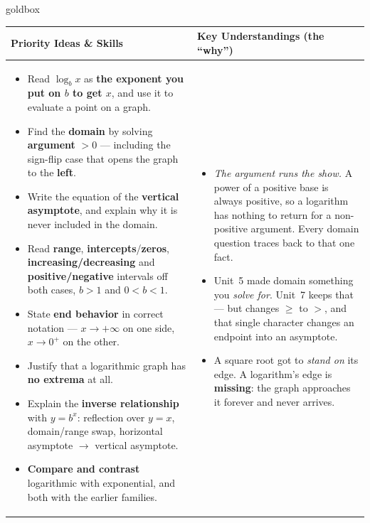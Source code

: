 \documentclass[10pt]{article}
\begin{document}
\renewcommand{\arraystretch}{1.4}
\begin{skillbox}{goldbox}
\begin{tabularx}{\linewidth}{@{}X|X@{}}
\textbf{Priority Ideas \& Skills} & \textbf{Key Understandings (the ``why'')} \\[2pt]
\hline
\vspace{-6pt}
\begin{itemize}[leftmargin=1.1em, nosep, after=\vspace{2pt}]
  \item Read $\log_b x$ as \textbf{the exponent you put on $b$ to get $x$}, and use it to evaluate a point on a graph.
  \item Find the \textbf{domain} by solving \textbf{argument} $>0$ --- including the sign-flip case that opens the graph to the \textbf{left}.
  \item Write the equation of the \textbf{vertical asymptote}, and explain why it is never included in the domain.
  \item Read \textbf{range}, \textbf{intercepts}/\textbf{zeros}, \textbf{increasing/decreasing} and \textbf{positive/negative} intervals off both cases, $b>1$ and $0<b<1$.
  \item State \textbf{end behavior} in correct notation --- $x\to+\infty$ on one side, $x\to 0^{+}$ on the other.
  \item Justify that a logarithmic graph has \textbf{no extrema} at all.
  \item Explain the \textbf{inverse relationship} with $y=b^x$: reflection over $y=x$, domain/range swap, horizontal asymptote $\to$ vertical asymptote.
  \item \textbf{Compare and contrast} logarithmic with exponential, and both with the earlier families.
\end{itemize}
&
\vspace{-6pt}
\begin{itemize}[leftmargin=1.1em, nosep, after=\vspace{2pt}]
  \item \emph{The argument runs the show.} A power of a positive base is always positive, so a logarithm has nothing to return for a non-positive argument. Every domain question traces back to that one fact.
  \item Unit~5 made domain something you \emph{solve for}. Unit~7 keeps that --- but changes $\ge$ to $>$, and that single character changes an endpoint into an asymptote.
  \item A square root got to \emph{stand on} its edge. A logarithm's edge is \textbf{missing}: the graph approaches it forever and never arrives.

\end{itemize}
\end{tabularx}
\end{skillbox}
\end{document}
